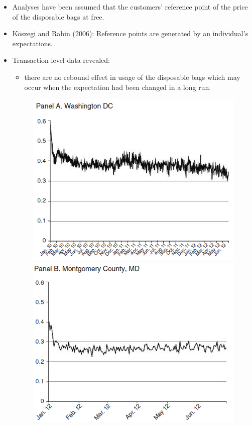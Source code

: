 \documentclass[../root]{subfiles}
\begin{document}
    \begin{itemize}
      \item Analyses have been assumed that the customers' reference point of the price of the disposable bags at free.
      \item K\"{o}szegi and Rabin (2006): Reference points are generated by an individual's expectations.
      \item Transaction-level data revealed:
      \begin{itemize}
        \item there are no rebound effect in usage of the disposable bags which may occur when the expectation had been changed in a long run.
      \end{itemize}
      \begin{figure}[ht]
        \centering
        \includegraphics[scale = .8]{0807tanji/F5A}
        \includegraphics[scale = .8]{0807tanji/F5B}
      \end{figure}
    \end{itemize}
\end{document}
